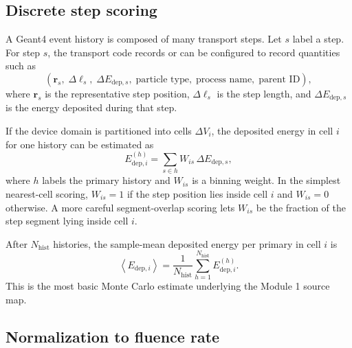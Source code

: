 \documentclass[11pt]{article}
\newcommand{\rpos}{\mathbf{r}}
\begin{document}
\subsection{Discrete step scoring}

A Geant4 event history is composed of many transport steps. Let $s$ label a step. For step $s$, the transport code records or can be configured to record quantities such as
\begin{equation}
\left(\rpos_s,\;\Delta \ell_s,\;\Delta E_{\mathrm{dep},s},\;\text{particle type},\;\text{process name},\;\text{parent ID}\right),
\end{equation}
where $\rpos_s$ is the representative step position, $\Delta \ell_s$ is the step length, and $\Delta E_{\mathrm{dep},s}$ is the energy deposited during that step.

If the device domain is partitioned into cells $\Delta V_i$, the deposited energy in cell $i$ for one history can be estimated as
\begin{equation}
E_{\mathrm{dep},i}^{(h)}
=
\sum_{s\in h} W_{is}\,\Delta E_{\mathrm{dep},s},
\label{eq:event_cell_dep}
\end{equation}
where $h$ labels the primary history and $W_{is}$ is a binning weight. In the simplest nearest-cell scoring, $W_{is}=1$ if the step position lies inside cell $i$ and $W_{is}=0$ otherwise. A more careful segment-overlap scoring lets $W_{is}$ be the fraction of the step segment lying inside cell $i$.

After $N_{\mathrm{hist}}$ histories, the sample-mean deposited energy per primary in cell $i$ is
\begin{equation}
\left< E_{\mathrm{dep},i}\right>
=
\frac{1}{N_{\mathrm{hist}}}
\sum_{h=1}^{N_{\mathrm{hist}}}E_{\mathrm{dep},i}^{(h)}.
\label{eq:mean_dep_per_primary}
\end{equation}
This is the most basic Monte Carlo estimate underlying the Module 1 source map.

\subsection{Normalization to fluence rate}
\end{document}
